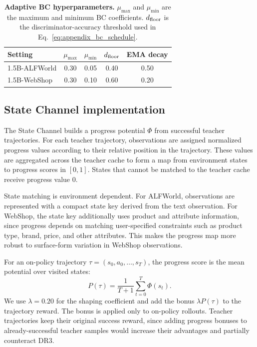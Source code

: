 \begin{table}[h]
\centering
\caption{
\textbf{Adaptive BC hyperparameters.}
$\mu_{\max}$ and $\mu_{\min}$ are the maximum and minimum BC coefficients.
$d_{\rm floor}$ is the discriminator-accuracy threshold used in Eq.~\eqref{eq:appendix_bc_schedule}.
}
\label{tab:bc_hparams}
\begin{tabular}{lcccc}
\toprule
Setting & $\mu_{\max}$ & $\mu_{\min}$ & $d_{\rm floor}$ & EMA decay \\
\midrule
1.5B-ALFWorld & 0.30 & 0.05 & 0.40 & 0.50 \\
1.5B-WebShop  & 0.30 & 0.10 & 0.60 & 0.20 \\
\bottomrule
\end{tabular}
\end{table}

\subsection{State Channel implementation}
\label{app:state_channel_impl}

The State Channel builds a progress potential $\Phi$ from successful teacher trajectories.
For each teacher trajectory, observations are assigned normalized progress values according to their relative position in the trajectory.
These values are aggregated across the teacher cache to form a map from environment states to progress scores in $[0,1]$.
States that cannot be matched to the teacher cache receive progress value $0$.

State matching is environment dependent.
For ALFWorld, observations are represented with a compact state key derived from the text observation.
For WebShop, the state key additionally uses product and attribute information, since progress depends on matching user-specified constraints such as product type, brand, price, and other attributes.
This makes the progress map more robust to surface-form variation in WebShop observations.

For an on-policy trajectory $\tau=(s_0,a_0,\ldots,s_T)$, the progress score is the mean potential over visited states:
\begin{equation}
P(\tau)
=
\frac{1}{T+1}\sum_{t=0}^{T}\Phi(s_t).
\label{eq:appendix_progress_score}
\end{equation}
We use $\lambda=0.20$ for the shaping coefficient and add the bonus $\lambda P(\tau)$ to the trajectory reward.
The bonus is applied only to on-policy rollouts.
Teacher trajectories keep their original success reward, since adding progress bonuses to already-successful teacher samples would increase their advantages and partially counteract DR3.


